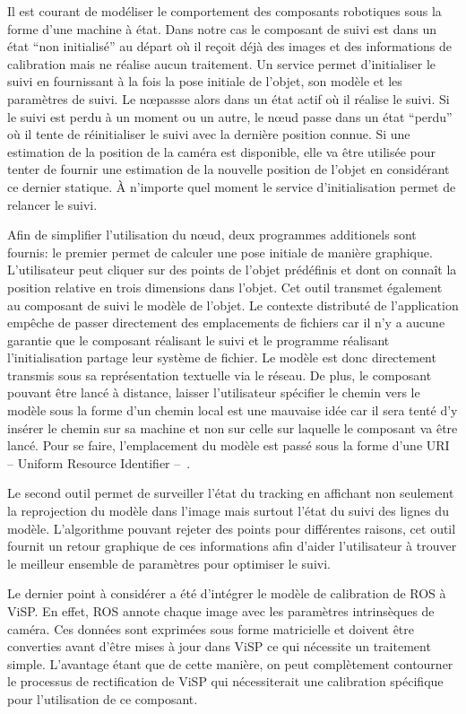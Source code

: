 Il est courant de modéliser le comportement des composants robotiques
sous la forme d'une machine à état. Dans notre cas le composant de
suivi est dans un état ``non initialisé'' au départ où il reçoit déjà
des images et des informations de calibration mais ne réalise aucun
traitement. Un service permet d'initialiser le suivi en fournissant à
la fois la pose initiale de l'objet, son modèle et les paramètres de
suivi. Le n\oe passse alors dans un état actif où il réalise le
suivi. Si le suivi est perdu à un moment ou un autre, le n\oe ud passe
dans un état ``perdu'' où il tente de réinitialiser le suivi avec la
dernière position connue. Si une estimation de la position de la
caméra est disponible, elle va être utilisée pour tenter de fournir
une estimation de la nouvelle position de l'objet en considérant ce
dernier statique. À n'importe quel moment le service d'initialisation
permet de relancer le suivi.


Afin de simplifier l'utilisation du n\oe ud, deux programmes
additionels sont fournis: le premier permet de calculer une pose
initiale de manière graphique. L'utilisateur peut cliquer sur des
points de l'objet prédéfinis et dont on connaît la position relative
en trois dimensions dans l'objet. Cet outil transmet également au
composant de suivi le modèle de l'objet. Le contexte distributé de
l'application empêche de passer directement des emplacements de
fichiers car il n'y a aucune garantie que le composant réalisant le
suivi et le programme réalisant l'initialisation partage leur système
de fichier. Le modèle est donc directement transmis sous sa
représentation textuelle via le réseau. De plus, le composant pouvant
être lancé à distance, laisser l'utilisateur spécifier le chemin vers
le modèle sous la forme d'un chemin local est une mauvaise idée car il
sera tenté d'y insérer le chemin sur sa machine et non sur celle sur
laquelle le composant va être lancé. Pour se faire, l'emplacement du
modèle est passé sous la forme d'une URI -- Uniform Resource
Identifier --~\citep{rfc2396}.


Le second outil permet de surveiller l'état du tracking en affichant
non seulement la reprojection du modèle dans l'image mais surtout
l'état du suivi des lignes du modèle. L'algorithme pouvant rejeter des
points pour différentes raisons, cet outil fournit un retour graphique
de ces informations afin d'aider l'utilisateur à trouver le meilleur
ensemble de paramètres pour optimiser le suivi.


Le dernier point à considérer a été d'intégrer le modèle de
calibration de ROS à ViSP. En effet, ROS annote chaque image avec les
paramètres intrinsèques de caméra. Ces données sont exprimées sous
forme matricielle et doivent être converties avant d'être mises à jour
dans ViSP ce qui nécessite un traitement simple. L'avantage étant que
de cette manière, on peut complètement contourner le processus de
rectification de ViSP qui nécessiterait une calibration spécifique
pour l'utilisation de ce composant.


